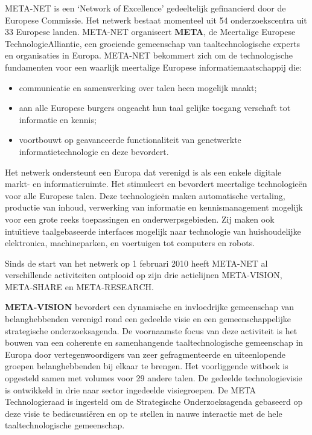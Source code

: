 \begin{multicols}{2}

    META-NET is een `Network of Excellence' gedeeltelijk gefinancierd door de Europese Commissie. Het netwerk bestaat momenteel uit 54 onderzoekscentra uit 33 Europese landen. META-NET organiseert \textbf{META}, de Meertalige Europese TechnologieAlliantie, een groeiende gemeenschap van taaltechnologische experts en organisaties in Europa. 
     META-NET bekommert zich om de technologische fundamenten voor een waarlijk meertalige Europese informatiemaatschappij die:
    \begin{itemize}
 	\item communicatie en samenwerking over talen heen mogelijk maakt;
 	\item aan alle Europese burgers ongeacht hun taal gelijke toegang verschaft tot  informatie en kennis;
 	\item voortbouwt op geavanceerde functionaliteit van genetwerkte informatietechnologie en deze bevordert.
    \end{itemize}
    
    Het netwerk ondersteunt een Europa dat verenigd is als een enkele digitale markt- en informatieruimte. 
    Het stimuleert en bevordert meertalige technologie{\"e}n voor alle Europese talen. Deze technologie{\"e}n maken automatische vertaling, productie van inhoud, verwerking van informatie en kennismanagement mogelijk voor een grote reeks toepassingen en onderwerpsgebieden.     Zij maken ook intu{\"\i}tieve taalgebaseerde interfaces mogelijk naar technologie van huishoudelijke elektronica, machineparken, en voertuigen tot computers en robots.
    
Sinds de start van het netwerk op 1 februari 2010 heeft META-NET al verschillende activiteiten ontplooid op zijn drie actielijnen  META-VISION, META-SHARE en META-RESEARCH.

    \textbf{META-VISION} bevordert een dynamische en invloedrijke gemeenschap van belanghebbenden verenigd rond een gedeelde visie en een gemeenschappelijke strategische onderzoeksagenda. De voornaamste focus van deze activiteit is het bouwen van een coherente en samenhangende taaltechnologische gemeenschap in Europa door vertegenwoordigers van zeer gefragmenteerde en uiteenlopende groepen belanghebbenden bij elkaar te brengen. Het voorliggende witboek is opgesteld samen met volumes voor 29 andere talen. De gedeelde technologievisie is ontwikkeld in drie naar sector ingedeelde visiegroepen. De  META Technologieraad is ingesteld om de Strategische Onderzoeksagenda gebaseerd op deze visie te bediscussi{\"e}ren en op te stellen in nauwe interactie met de hele taaltechnologische gemeenschap.
       

\end{multicols}
